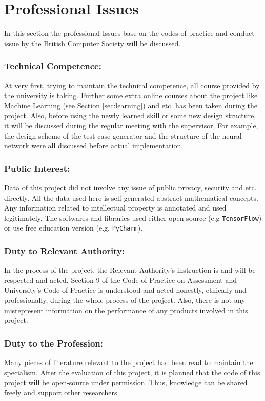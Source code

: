 \section{Professional Issues}
\label{sec:profession}
In this section the professional Issues base on the codes of practice and conduct issue by the British Computer Society will be discussed.

\subsubsection*{Technical Competence:}

At very first, trying to maintain the technical competence, all course provided by the university is taking. 
Further some extra online courses about the project like Machine Learning (see Section \ref{sec:learning}) and etc. has been taken during the project.
Also, before using the newly learned skill or some new design structure, it will be discussed during the regular meeting with the supervisor.
For example, the design scheme of the test case generator and the structure of the neural network were all discussed before actual implementation.

\subsubsection*{Public Interest:}
Data of this project did not involve any issue of public privacy, security and etc. directly.
All the data used here is self-generated abstract mathematical concepts. 
Any information related to intellectual property is annotated and used legitimately.
The softwares and libraries used either open source (e.g \texttt{TensorFlow}) or use free education version (e.g. \texttt{PyCharm}).

\subsubsection*{Duty to Relevant Authority:}
In the process of the project, the Relevant Authority's instruction is and will be respected and acted.
Section 9 of the Code of Practice on Assessment and University's Code of Practice is understood and acted honestly, ethically and professionally, during the whole process of the project.
Also, there is not any misrepresent information on the performance of any products involved in this project.

\subsubsection*{Duty to the Profession:}
Many pieces of literature relevant to the project had been read to maintain the specialism.
After the evaluation of this project, it is planned that the code of this project will be open-source under permission.
Thus, knowledge can be shared freely and support other researchers.



